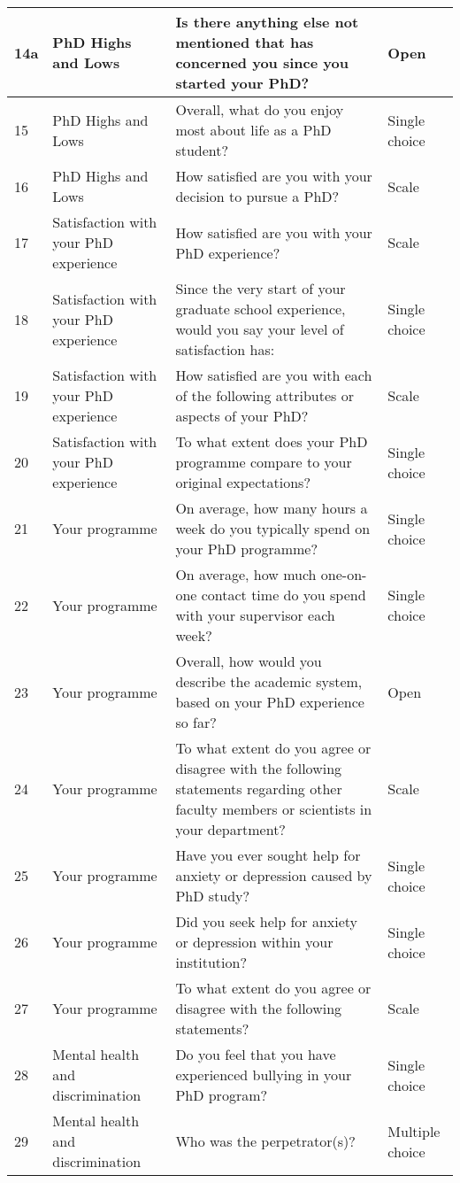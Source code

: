 \documentclass[
]{article}
\begin{document}
\begin{tabular}{l|l|l|l}
\hline
14a & PhD Highs and Lows & Is there anything else not mentioned that has concerned you since you started your PhD? & Open\\
\hline
15 & PhD Highs and Lows & Overall, what do you enjoy most about life as a PhD student? & Single choice\\
\hline
16 & PhD Highs and Lows & How satisfied are you with your decision to pursue a PhD? & Scale\\
\hline
17 & Satisfaction with your PhD experience & How satisfied are you with your PhD experience? & Scale\\
\hline
18 & Satisfaction with your PhD experience & Since the very start of your graduate school experience, would you say your level of satisfaction has: & Single choice\\
\hline
19 & Satisfaction with your PhD experience & How satisfied are you with each of the following attributes or aspects of your PhD? & Scale\\
\hline
20 & Satisfaction with your PhD experience & To what extent does your PhD programme compare to your original expectations? & Single choice\\
\hline
21 & Your programme & On average, how many hours a week do you typically spend on your PhD programme? & Single choice\\
\hline
22 & Your programme & On average, how much one-on-one contact time do you spend with your supervisor each week? & Single choice\\
\hline
23 & Your programme & Overall, how would you describe the academic system, based on your PhD experience so far? & Open\\
\hline
24 & Your programme & To what extent do you agree or disagree with the following statements regarding other faculty members or scientists in your department? & Scale\\
\hline
25 & Your programme & Have you ever sought help for anxiety or depression caused by PhD study? & Single choice\\
\hline
26 & Your programme & Did you seek help for anxiety or depression within your institution? & Single choice\\
\hline
27 & Your programme & To what extent do you agree or disagree with the following statements? & Scale\\
\hline
28 & Mental health and discrimination & Do you feel that you have experienced bullying in your PhD program? & Single choice\\
\hline
29 & Mental health and discrimination & Who was the perpetrator(s)? & Multiple choice\\

\end{tabular}
\end{document}
